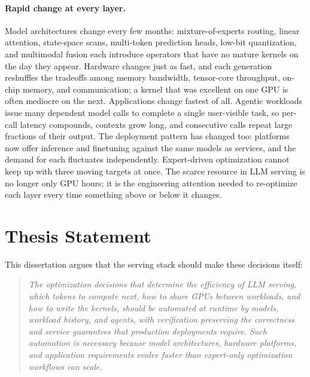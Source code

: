 \paragraph{Rapid change at every layer.}
Model architectures change every few months: mixture-of-experts routing, linear attention, state-space scans, multi-token prediction heads, low-bit quantization, and multimodal fusion each introduce operators that have no mature kernels on the day they appear.
Hardware changes just as fast, and each generation reshuffles the tradeoffs among memory bandwidth, tensor-core throughput, on-chip memory, and communication; a kernel that was excellent on one GPU is often mediocre on the next.
Applications change fastest of all.
Agentic workloads issue many dependent model calls to complete a single user-visible task, so per-call latency compounds, contexts grow long, and consecutive calls repeat large fractions of their output.
The deployment pattern has changed too: platforms now offer inference and finetuning against the same models as services, and the demand for each fluctuates independently.
Expert-driven optimization cannot keep up with three moving targets at once.
The scarce resource in LLM serving is no longer only GPU hours; it is the engineering attention needed to re-optimize each layer every time something above or below it changes.

\section{Thesis Statement}
\label{intro:sec:statement}

This dissertation argues that the serving stack should make these decisions itself:

\begin{quote}
\emph{The optimization decisions that determine the efficiency of LLM serving, which tokens to compute next, how to share GPUs between workloads, and how to write the kernels, should be automated at runtime by models, workload history, and agents, with verification preserving the correctness and service guarantees that production deployments require.
Such automation is necessary because model architectures, hardware platforms, and application requirements evolve faster than expert-only optimization workflows can scale.}
\end{quote}

